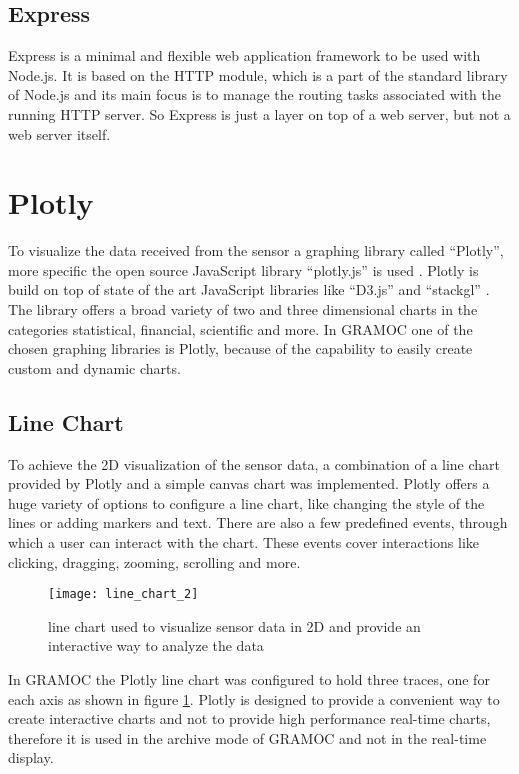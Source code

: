 \subsection{Express}
Express is a minimal and flexible web application framework to be used with Node.js. It is based on the HTTP module, which is a part of the standard library of Node.js and its main focus is to manage the routing tasks associated with the running HTTP server. So Express is just a layer on top of a web server, but not a web server itself.

\section{Plotly}
\label{sec:Plotly}
To visualize the data received from the sensor a graphing library called ``Plotly'', more specific the open source JavaScript library ``plotly.js'' is used \cite{Plotly, PlotlyJS}. Plotly is build on top of state of the art JavaScript libraries like ``D3.js''  and ``stackgl'' \cite{d3, stackgl}. The library offers a broad variety of two and three dimensional charts in the categories statistical, financial, scientific and more. In GRAMOC one of the chosen graphing libraries is Plotly, because of the capability to easily create custom and dynamic charts.

\subsection{Line Chart}
To achieve the 2D visualization of the sensor data, a combination of a line chart provided by Plotly and a simple canvas chart was implemented. Plotly offers a huge variety of options to configure a line chart, like changing the style of the lines or adding markers and text. There are also a few predefined events, through which a user can interact with the chart. These events cover interactions like clicking, dragging, zooming, scrolling and more.

\begin{figure}[H]
    \centering
    \texttt{[image: line\_chart\_2]}
    \caption{line chart used to visualize sensor data in 2D and provide an interactive way to analyze the data}
    \label{fig:plotlylinechart}
\end{figure}

In GRAMOC the Plotly line chart was configured to hold three traces, one for each axis as shown in figure \ref{fig:plotlylinechart}. Plotly is designed to provide a convenient way to create interactive charts and not to provide high performance real-time charts, therefore it is used in the archive mode of GRAMOC and not in the real-time display.

